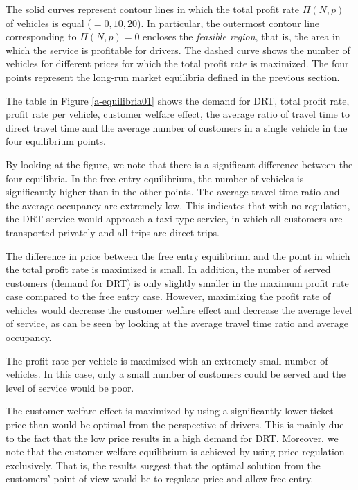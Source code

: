\documentclass[dissertation,draft*]{aaltoseries}
\begin{document}
The solid curves represent contour lines in which the total profit rate $\Pi(N,p)$ of vehicles is equal ($=0,10,20$).
In particular, the outermost contour line corresponding to $\Pi(N,p)=0$ encloses the 
\emph{feasible region}, that is, the area in which the service is profitable for drivers.
The dashed curve shows the number of vehicles for different prices for which
the total profit rate is maximized. The four points represent the long-run market equilibria
defined in the previous section.

The table in Figure \ref{a-equilibria01} shows the demand for DRT, total profit rate, profit rate per vehicle, 
customer welfare effect, the average ratio of travel time to direct travel time
and the average number of customers in a single vehicle in the four equilibrium points.

By looking at the figure, we note that there is a significant difference between the
four equilibria. In the free entry equilibrium, the number of vehicles is significantly
higher than in the other points. The average travel time ratio 
and the average occupancy are extremely low. This indicates that with no regulation, the
DRT service would approach a taxi-type service, in which all customers are 
transported privately and all trips are direct trips.

The difference in price between the free entry equilibrium and
the point in which the total profit rate is maximized is small. 
In addition, the number of served customers (demand for DRT)
is only slightly smaller in the maximum profit rate case compared to the free entry case.
However, maximizing the profit rate of vehicles would decrease the 
customer welfare effect and decrease the average level of service,
as can be seen by looking at the average travel time ratio and average occupancy.

The profit rate per vehicle is maximized with an extremely small number of vehicles.
In this case, only a small number of customers could be served and the level of service
would be poor.

The customer welfare effect is maximized by using a significantly
lower ticket price than would be optimal from the perspective of drivers. This is mainly due to the 
fact that the low price results in a high demand for DRT. Moreover, we note that the customer welfare
equilibrium is achieved by using price regulation exclusively. That is, the results suggest that 
the optimal solution from the customers' point of view would be to regulate price and allow free 
entry.
\end{document}
